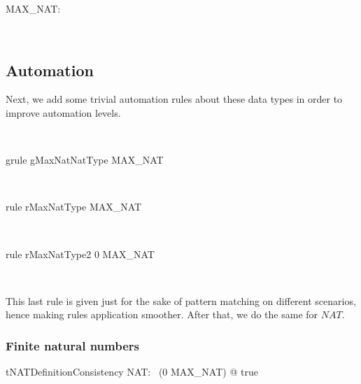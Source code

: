 \begin{LNewADef}
\begin{axdef}
   MAX\_NAT: \nat
\end{axdef}~\end{LNewADef}

\subsection*{Automation}

Next, we add some trivial automation rules about these data types
in order to improve automation levels.
%
\begin{LGRT}
~\end{LGRT}
%
\begin{LGRT}
\begin{theorem}{grule gMaxNatNatType}
    MAX\_NAT \in  \nat
\end{theorem}~\end{LGRT}
%
\begin{LRRT}
\begin{theorem}{rule rMaxNatType}
    MAX\_NAT 
\end{theorem}~\end{LRRT}
%
\begin{LRRT}
\begin{theorem}{rule rMaxNatType2}
    0 \leq  MAX\_NAT
\end{theorem}~\end{LRRT}
%
This last rule is given just for the sake of
pattern matching on different scenarios, hence
making rules application smoother.
After that, we do the same for $NAT$.
%

\subsubsection{Finite natural numbers}

%
\begin{LConsistency}
\begin{theorem}{tNATDefinitionConsistency}
   \exists NAT: \power~(0 \upto MAX\_NAT) @ true
\end{theorem}~\end{LConsistency}

